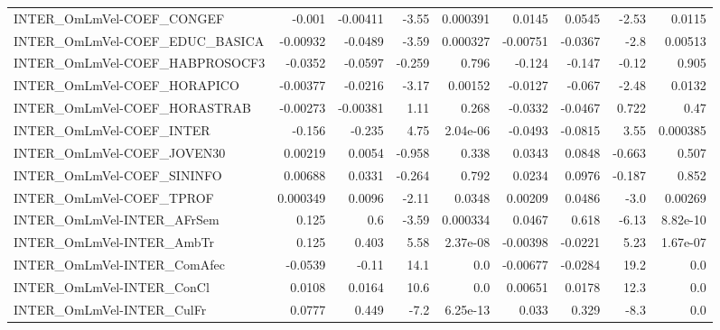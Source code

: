 \begin{tabular}{lrrrrrrrr}
INTER\_OmLmVel-COEF\_CONGEF              &      -0.001 &     -0.00411 &    -3.55 & 0.000391 &     0.0145 &      0.0545 &        -2.53 &        0.0115 \\
INTER\_OmLmVel-COEF\_EDUC\_BASICA         &    -0.00932 &      -0.0489 &    -3.59 & 0.000327 &   -0.00751 &     -0.0367 &         -2.8 &       0.00513 \\
INTER\_OmLmVel-COEF\_HABPROSOCF3         &     -0.0352 &      -0.0597 &   -0.259 &    0.796 &     -0.124 &      -0.147 &        -0.12 &         0.905 \\
INTER\_OmLmVel-COEF\_HORAPICO            &    -0.00377 &      -0.0216 &    -3.17 &  0.00152 &    -0.0127 &      -0.067 &        -2.48 &        0.0132 \\
INTER\_OmLmVel-COEF\_HORASTRAB           &    -0.00273 &     -0.00381 &     1.11 &    0.268 &    -0.0332 &     -0.0467 &        0.722 &          0.47 \\
INTER\_OmLmVel-COEF\_INTER               &      -0.156 &       -0.235 &     4.75 & 2.04e-06 &    -0.0493 &     -0.0815 &         3.55 &      0.000385 \\
INTER\_OmLmVel-COEF\_JOVEN30             &     0.00219 &       0.0054 &   -0.958 &    0.338 &     0.0343 &      0.0848 &       -0.663 &         0.507 \\
INTER\_OmLmVel-COEF\_SININFO             &     0.00688 &       0.0331 &   -0.264 &    0.792 &     0.0234 &      0.0976 &       -0.187 &         0.852 \\
INTER\_OmLmVel-COEF\_TPROF               &    0.000349 &       0.0096 &    -2.11 &   0.0348 &    0.00209 &      0.0486 &         -3.0 &       0.00269 \\
INTER\_OmLmVel-INTER\_AFrSem             &       0.125 &          0.6 &    -3.59 & 0.000334 &     0.0467 &       0.618 &        -6.13 &      8.82e-10 \\
INTER\_OmLmVel-INTER\_AmbTr              &       0.125 &        0.403 &     5.58 & 2.37e-08 &   -0.00398 &     -0.0221 &         5.23 &      1.67e-07 \\
INTER\_OmLmVel-INTER\_ComAfec            &     -0.0539 &        -0.11 &     14.1 &      0.0 &   -0.00677 &     -0.0284 &         19.2 &           0.0 \\
INTER\_OmLmVel-INTER\_ConCl              &      0.0108 &       0.0164 &     10.6 &      0.0 &    0.00651 &      0.0178 &         12.3 &           0.0 \\
INTER\_OmLmVel-INTER\_CulFr              &      0.0777 &        0.449 &     -7.2 & 6.25e-13 &      0.033 &       0.329 &         -8.3 &           0.0 \\

\end{tabular}
